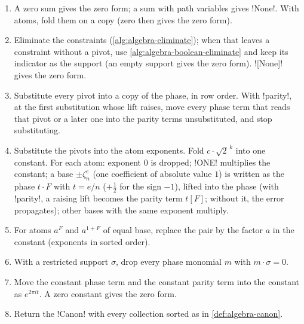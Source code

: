 \begin{algorithm}[\texttt{canonical(ps, parity=False)}]\label{alg:algebra-canonical}
\begin{enumerate}
\item A zero sum gives the zero form; a sum with path variables gives \py!None!. With atoms, fold them on a copy (zero then gives the zero form).
\item Eliminate the constraints (\cref{alg:algebra-eliminate}); when that leaves a constraint without a pivot, use \cref{alg:algebra-boolean-eliminate} and keep its indicator as the support (an empty support gives the zero form). \py![None]! gives the zero form.
\item Substitute every pivot into a copy of the phase, in row order. With \code!parity!, at the first substitution whose lift raises, move every phase term that reads that pivot or a later one into the parity terms unsubstituted, and stop substituting.
\item Substitute the pivots into the atom exponents. Fold $c\cdot\sqrt2^{\,k}$ into one constant. For each atom: exponent $0$ is dropped; \py!ONE! multiplies the constant; a base $\pm\zeta_n^e$ (one coefficient of absolute value $1$) is written as the phase $t\cdot F$ with $t=e/n$ ($+\tfrac12$ for the sign $-1$), lifted into the phase (with \code!parity!, a raising lift becomes the parity term $t[F]$; without it, the error propagates); other bases with the same exponent multiply.
\item For atoms $a^{F}$ and $a^{1+F}$ of equal base, replace the pair by the factor $a$ in the constant (exponents in sorted order).
\item With a restricted support $\sigma$, drop every phase monomial $m$ with $m\cdot\sigma=0$.
\item Move the constant phase term and the constant parity term into the constant as $e^{2\pi it}$. A zero constant gives the zero form.
\item Return the \py!Canon! with every collection sorted as in \cref{def:algebra-canon}.
\end{enumerate}
\end{algorithm}

